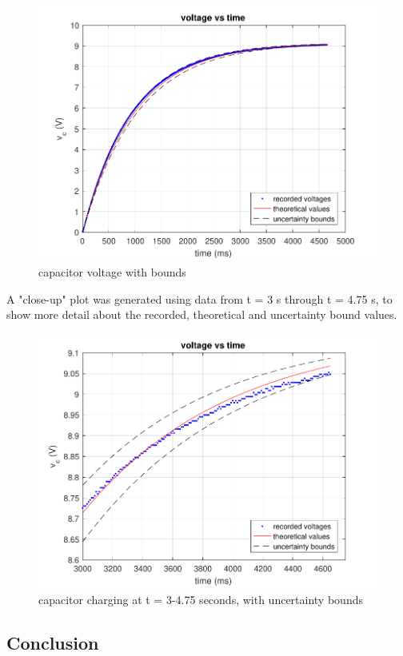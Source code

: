 \documentclass[10pt,twocolumn]{article}
\begin{document}
\begin{figure}[hbt]
	\centering
	\includegraphics[width=.9\linewidth]{figures/capBounds.pdf}
	\caption{capacitor voltage with bounds}
	\label{fig:bounds}
\end{figure}

A "close-up" plot was generated using data from t = 3 s through t = 4.75 s, to show more detail about the recorded, theoretical and uncertainty bound values.

\begin{figure}[hbt]
	\centering
	\includegraphics[width=.9\linewidth]{figures/closeUp.pdf}
	\caption{capacitor charging at t = 3-4.75 seconds, with uncertainty bounds}
	\label{fig:bounds}
\end{figure}

\subsection{Conclusion}
\end{document}
